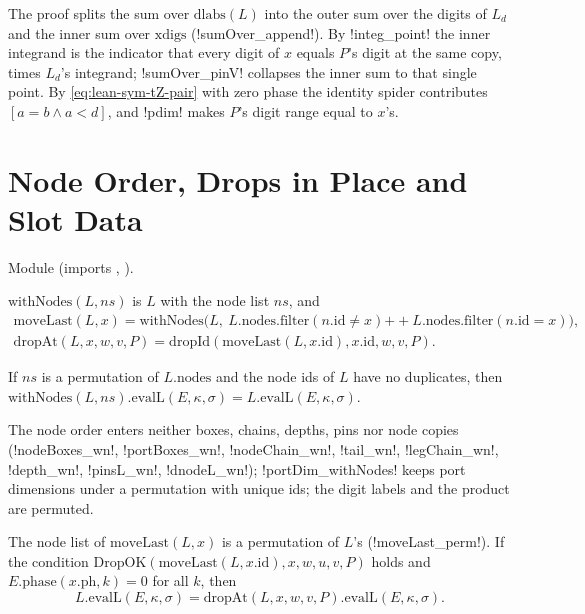 The proof splits the sum over $\mathrm{dlabs}(L)$ into the outer sum over the digits of $L_d$ and the inner sum over $\mathrm{xdigs}$ (\lean!sumOver_append!). By \lean!integ_point! the inner integrand is the indicator that every digit of $x$ equals $P$'s digit at the same copy, times $L_d$'s integrand; \lean!sumOver_pinV! collapses the inner sum to that single point. By \eqref{eq:lean-sym-tZ-pair} with zero phase the identity spider contributes $[a=b\land a<d]$, and \lean!pdim! makes $P$'s digit range equal to $x$'s.

\section{Node Order, Drops in Place and Slot Data}\label{sec:lean-sym-form}

Module  (imports , ).

\begin{definition}
$\mathrm{withNodes}(L,ns)$ is $L$ with the node list $ns$, and
\begin{gather*}
\mathrm{moveLast}(L,x)=\mathrm{withNodes}\bigl(L,\ L.\mathrm{nodes.filter}(n.\mathrm{id}\neq x)\mathbin{+\!\!+}L.\mathrm{nodes.filter}(n.\mathrm{id}=x)\bigr),\\
\mathrm{dropAt}(L,x,w,v,P)=\mathrm{dropId}(\mathrm{moveLast}(L,x.\mathrm{id}),x.\mathrm{id},w,v,P).
\end{gather*}
\end{definition}

\begin{theorem}
If $ns$ is a permutation of $L.\mathrm{nodes}$ and the node ids of $L$ have no duplicates, then $\mathrm{withNodes}(L,ns).\mathrm{evalL}(E,\kappa,\sigma)=L.\mathrm{evalL}(E,\kappa,\sigma)$.
\end{theorem}

The node order enters neither boxes, chains, depths, pins nor node copies (\lean!nodeBoxes_wn!, \lean!portBoxes_wn!, \lean!nodeChain_wn!, \lean!tail_wn!, \lean!legChain_wn!, \lean!depth_wn!, \lean!pinsL_wn!, \lean!dnodeL_wn!); \lean!portDim_withNodes! keeps port dimensions under a permutation with unique ids; the digit labels and the product are permuted.

\begin{theorem}
The node list of $\mathrm{moveLast}(L,x)$ is a permutation of $L$'s (\lean!moveLast_perm!).
If the condition $\mathrm{DropOK}(\mathrm{moveLast}(L,x.\mathrm{id}),\allowbreak x,w,u,v,P)$ holds and $E.\mathrm{phase}(x.\mathrm{ph},k)=0$ for all $k$, then
\[
L.\mathrm{evalL}(E,\kappa,\sigma)=\mathrm{dropAt}(L,x,w,v,P).\mathrm{evalL}(E,\kappa,\sigma).
\]
\end{theorem}

